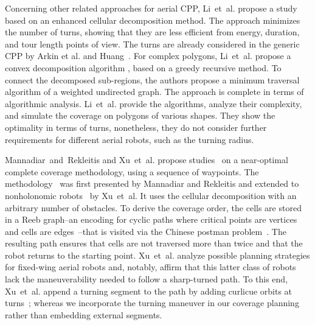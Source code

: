 Concerning other related approaches for aerial CPP, Li~et~al. propose a study~\citep{li2011coverage} based on an enhanced cellular decomposition method. The approach minimizes the number of turns, showing that they are less efficient from energy, duration, and tour length points of view. The turns are already considered in the generic CPP by Arkin et al. and Huang~\citep{arkin2001optimal,arkin2005optimal,huang2001optimal}. For complex polygons, Li~et~al. propose a convex decomposition algorithm%
, based on a greedy recursive method. To connect the decomposed sub-regions, the authors propose a minimum traversal algorithm of a weighted undirected graph. The approach is complete in terms of algorithmic analysis. Li~et~al. provide the algorithms, analyze their complexity, and simulate the coverage on polygons of various shapes. They show the optimality in terms of turns, nonetheless, they do not consider further requirements for different aerial robots, such as the turning radius.

Mannadiar~and~Rekleitis and Xu~et~al. propose studies~\citep{mannadiar2010optimal,xu2011optimal,xu2014efficient} on a near-optimal complete coverage methodology, using a sequence of waypoints.
The methodology~\citep{mannadiar2010optimal} was first presented by Mannadiar and Rekleitis and extended to nonholonomic robots~\citep{xu2011optimal,xu2014efficient} by Xu~et~al. It uses the cellular decomposition 
with an arbitrary number of obstacles. To derive the coverage order, the cells are stored in a Reeb graph--an encoding for cyclic paths where critical points are vertices and cells are edges~\citep{fomenko1997topological}--that is visited via the Chinese postman problem~\citep{eiselt2000historical}. The resulting path ensures that cells are not traversed more than twice and that the robot returns to the starting point. Xu~et~al. analyze possible planning strategies for fixed-wing aerial robots and, notably, affirm that this latter class of robots lack the maneuverability needed to follow a sharp-turned path.  
To this end, Xu~et~al. append a turning segment to the path by adding curlicue orbits at turns~\citep{xu2014efficient}; whereas we incorporate the turning maneuver in our coverage planning rather than embedding external segments.

